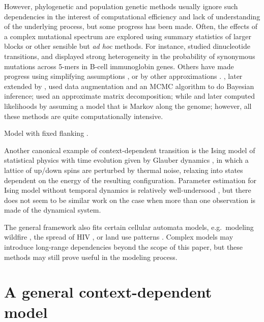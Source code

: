 \documentclass{article}
\theoremstyle{plain}
\theoremstyle{definition}
\begin{document}
However, phylogenetic and population genetic methods usually ignore such dependencies
in the interest of computational efficiency and lack of understanding of the underlying process,
but some progress has been made.
Often, the effects of a complex mutational spectrum are explored using summary statistics of larger blocks or other sensible but \textit{ad hoc} methods.
For instance, \citet{arndt2003sequence} studied dinucleotide transitions,
and \citet{yaari2013models} displayed strong heterogeneity in the probability of synonymous mutations across 5-mers
in B-cell immunoglobin genes.
Others have made progress using simplifying assumptions \citep{berard2012accurate},
or by other approximations \citep{christensen2005pseudolikelihood}.
\citet{pedersen2000dependent}, later extended by
\citet{Hwang2004-pj,hobolth2008markov,baele2010using}, used data augmentation and an MCMC algorithm to do Bayesian inference;
\citet{lunter2004nucleotide} used an approximate matrix decomposition;
while \citet{siepel2004phylogenetic} and later \citep{baele2010modelling} computed likelihoods by assuming a model that is Markov along the genome;
however, all these methods are quite computationally intensive.

Model with fixed flanking \citet{saunders2007insights}.

Another canonical example of context-dependent transition is the Ising model of statistical physics
with time evolution given by Glauber dynamics \citep{glauber1963timedependent},
in which a lattice of up/down spins are perturbed by thermal noise,
relaxing into states dependent on the energy of the resulting configuration.
Parameter estimation for Ising model without temporal dynamics
is relatively well-undersood \citep{pickard1982inference,frigessi1990parameter},
but there does not seem to be similar work on the case when more than one observation is made of the dynamical system.

The general framework also fits certain cellular automata models,
e.g.\ modeling wildfire \citep{clarke1994cellular},
the spread of HIV \citep{zorzenondossantos2001dynamics},
or land use patterns \citep{wu2002calibration}.
Complex models may introduce long-range dependencies beyond the scope of this paper,
but these methods may still prove useful in the modeling process.




\section{A general context-dependent model}
\end{document}
